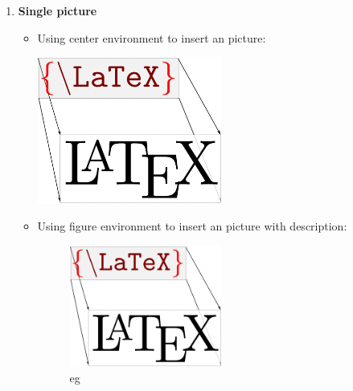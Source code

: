 \begin{solution}
	\begin{enumerate}[nosep,label=(\arabic*)]
		\item \textbf{Single picture} \\
			\begin{itemize}
	        \item Using center environment to insert an picture: \\
\begin{latexample}[]
\begin{center}
  \includegraphics[width=0.5\textwidth]{./pic/latex.png}
\end{center}
\end{latexample}
		    \item Using figure environment to insert an picture with description: \\
\begin{latexample}[]
\begin{figure}[H]
  \centering
  \includegraphics[width=0.5\textwidth]{./pic/latex.png}
  \caption{eg}
\end{figure}
\end{latexample}
			\end{itemize}


\end{enumerate}
\end{solution}
